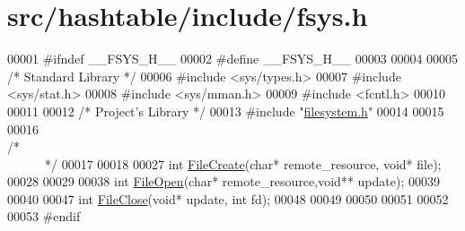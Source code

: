 \hypertarget{fsys_8h_source}{
\section{src/hashtable/include/fsys.h}
}

\begin{DoxyCode}
00001 \textcolor{preprocessor}{#ifndef         \_\_FSYS\_H\_\_}
00002 \textcolor{preprocessor}{}\textcolor{preprocessor}{#define         \_\_FSYS\_H\_\_}
00003 \textcolor{preprocessor}{}
00004 
00005 \textcolor{comment}{/*      Standard Library        */}
00006 \textcolor{preprocessor}{#include        <sys/types.h>}
00007 \textcolor{preprocessor}{#include        <sys/stat.h>}
00008 \textcolor{preprocessor}{#include        <sys/mman.h>}
00009 \textcolor{preprocessor}{#include        <fcntl.h>}
00010 
00011 
00012 \textcolor{comment}{/*      Project's Library       */}
00013 \textcolor{preprocessor}{#include        "\hyperlink{filesystem_8h}{filesystem.h}"}
00014 
00015 
00016 \textcolor{comment}{/*~~~~~~~~~~~~~~~~~~~~~~~~~~~~~~~~~~~~~~~~~~~~~~~~~~~~~~~~~~~~~~~~~~~~~~~~~~~~*/}
00017 
00018 
00027 \textcolor{keywordtype}{int}             \hyperlink{fsys_8c_a2e77e14356c513e166ea8d99cc26188f}{FileCreate}(\textcolor{keywordtype}{char}* remote\_resource, \textcolor{keywordtype}{void}* file);
00028 
00029 
00038 \textcolor{keywordtype}{int}             \hyperlink{fsys_8c_a2dfa2769d6b10177c42cf8de5ea90fe8}{FileOpen}(\textcolor{keywordtype}{char}* remote\_resource,\textcolor{keywordtype}{void}** update);
00039 
00040 
00047 \textcolor{keywordtype}{int}             \hyperlink{fsys_8c_a73375e1536442b191a94f1dfa9f35669}{FileClose}(\textcolor{keywordtype}{void}* update, \textcolor{keywordtype}{int} fd);
00048 
00049 
00050 
00051 
00052 
00053 \textcolor{preprocessor}{#endif}
\end{DoxyCode}
